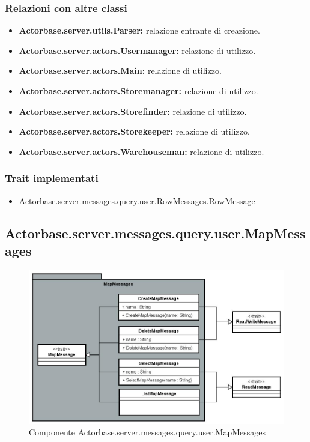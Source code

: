 \documentclass[a4paper]{article}
\begin{document}
			\subsubsection{Relazioni con altre classi}
				\begin{itemize}
					\item \textbf{Actorbase.server.utils.Parser:} relazione entrante di creazione.
					\item \textbf{Actorbase.server.actors.Usermanager:} relazione di utilizzo.
					\item \textbf{Actorbase.server.actors.Main:} relazione di utilizzo.
					\item \textbf{Actorbase.server.actors.Storemanager:} relazione di utilizzo.
					\item \textbf{Actorbase.server.actors.Storefinder:} relazione di utilizzo.
					\item \textbf{Actorbase.server.actors.Storekeeper:} relazione di utilizzo.
					\item \textbf{Actorbase.server.actors.Warehouseman:} relazione di utilizzo.
				\end{itemize}
			\subsubsection{Trait implementati}
				\begin{itemize}
					\item Actorbase.server.messages.query.user.RowMessages.RowMessage
				\end{itemize}
			
		\subsection{Actorbase.server.messages.query.user.MapMessages}
		
			\begin{figure}[H]
				\centering
				\includegraphics[width=\textwidth]{ST/Server/mapMessagesLevel.jpg}
				\caption{Componente Actorbase.server.messages.query.user.MapMessages}
			\end{figure}
			
\end{document}
